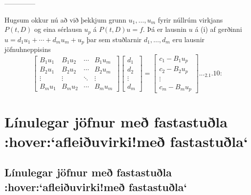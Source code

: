 --------------




Hugsum okkur nú að við þekkjum grunn $u_1,\dots,u_m$ fyrir núllrúm
virkjans $P(t,D)$ og eina sérlausn $u_p$  á $P(t,D)u=f$.  Þá er lausnin $u$
á  (i) af gerðinni $u=d_1u_1+\cdots+d_mu_m+u_p$ þar sem stuðlarnir 
$d_1,\dots,d_m$ eru lausnir jöfnuhneppisins
\begin{equation*}
\left[\begin{matrix} B_1u_1 & B_1u_2 & \cdots & B_1u_m\\
B_2u_1 & B_2u_2 & \cdots & B_2u_m\\
\vdots & \vdots &\ddots & \vdots \\
B_mu_1 & B_mu_2 & \cdots & B_mu_m
\end{matrix}\right]
\left[\begin{matrix} d_1\\ d_2\\ \vdots \\ d_m\end{matrix}\right]
=\left[\begin{matrix} c_1-B_1u_p\\ c_2-B_2u_p\\ \vdots \\ c_m-B_mu_p
\end{matrix}\right].


.. _2.1.10:

\end{equation*}


\section{Línulegar jöfnur með fastastuðla :hover:`afleiðuvirki!með
fastastuðla`}

\subsection{Línulegar jöfnur með fastastuðla :hover:`afleiðuvirki!með
fastastuðla`}

